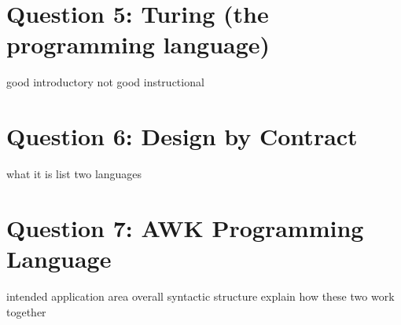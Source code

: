 \documentclass[a4paper]{article}
\begin{document}
\section{Question 5: Turing (the programming language)}
	good introductory
	not good instructional
\section{Question 6: Design by Contract}
	what it is
	list two languages
\section{Question 7: AWK Programming Language}
	intended application area
	overall syntactic structure
	explain how these two work together

{}

	
\end{document}
